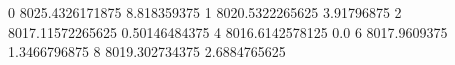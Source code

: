 0 8025.4326171875 8.818359375
1 8020.5322265625 3.91796875
2 8017.11572265625 0.50146484375
4 8016.6142578125 0.0
6 8017.9609375 1.3466796875
8 8019.302734375 2.6884765625
